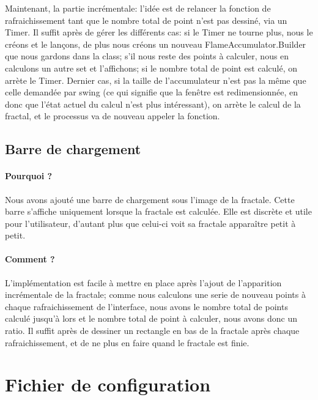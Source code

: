 \documentclass[a4paper]{report}
\begin{document}
Maintenant, la partie incrémentale: l'idée est de relancer la fonction de rafraichissement tant que le nombre total de point n'est pas dessiné, via un Timer. Il suffit après de gérer les différents cas: si le Timer ne tourne plus, nous le créons et le lançons, de plus nous créons un nouveau FlameAccumulator.Builder que nous gardons dans la class; s'il nous reste des points à calculer, nous en calculons un autre set et l'affichons; si le nombre total de point est calculé, on arrète le Timer. Dernier cas, si la taille de l'accumulateur n'est pas la même que celle demandée par swing (ce qui signifie que la fenêtre est redimensionnée, en donc que l'état actuel du calcul n'est plus intéressant), on arrète le calcul de la fractal, et le processus va de nouveau appeler la fonction.

\subsection*{Barre de chargement}
\paragraph{Pourquoi ?}
Nous avons ajouté une barre de chargement sous l'image de la fractale. Cette barre s'affiche uniquement lorsque la fractale est calculée. Elle est discrète et utile pour l'utilisateur, d'autant plus que celui-ci voit sa fractale apparaître petit à petit.

\paragraph{Comment ?}
L'implémentation est facile à mettre en place après l'ajout de l'apparition incrémentale de la fractale; comme nous calculons une serie de nouveau points à chaque rafraichissement de l'interface, nous avons le nombre total de points calculé jusqu'à lors et le nombre total de point à calculer, nous avons donc un ratio. Il suffit après de dessiner un rectangle en bas de la fractale après chaque rafraichissement, et de ne plus en faire quand le fractale est finie.

\section*{Fichier de configuration}
\end{document}
